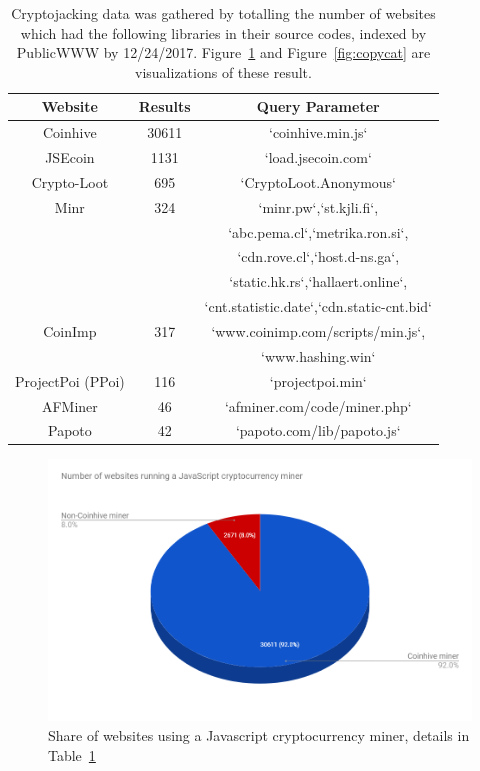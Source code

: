 \begin{table}[t]
\centering
\begin{tabular}{|cc|c|}
\hline
\textbf{Website} & \textbf{Results} & \textbf{Query Parameter}  \\ \hline
Coinhive & 30611 & `coinhive.min.js`   \\  \hline
JSEcoin & 1131 & `load.jsecoin.com`   \\  \hline
Crypto-Loot & 695 & `CryptoLoot.Anonymous`  \\  \hline
Minr & 324 & `minr.pw`,`st.kjli.fi`, \\
~  & ~ &  `abc.pema.cl`,`metrika.ron.si`, \\  
~  & ~ &  `cdn.rove.cl`,`host.d-ns.ga`, \\  
~  & ~ &  `static.hk.rs`,`hallaert.online`, \\  
~  & ~ &  `cnt.statistic.date`,`cdn.static-cnt.bid` \\     \hline
CoinImp & 317 &`www.coinimp.com/scripts/min.js`,  \\  \hline
~  & ~ &  `www.hashing.win` \\     \hline
ProjectPoi (PPoi) & 116 & `projectpoi.min`  \\  \hline
AFMiner & 46 & `afminer.com/code/miner.php`	  \\  \hline
Papoto & 42 & `papoto.com/lib/papoto.js`  \\ \hline
\end{tabular}
\caption{Cryptojacking data was gathered by totalling the number of websites which had the following libraries in their source codes, indexed by PublicWWW by 12/24/2017. Figure~\ref{fig:coinhivevscopycats} and Figure~\ref{fig:copycat} are visualizations of these result.\label{tab:findcoinhive}}
\end{table}

\begin{figure}[t]
\centering
\includegraphics[width=0.9\linewidth]{figures/coinhive-miners-pie.png}
\caption{Share of websites using a Javascript cryptocurrency miner, details in Table~\ref{tab:findcoinhive}  \label{fig:coinhivevscopycats}}
\end{figure}

